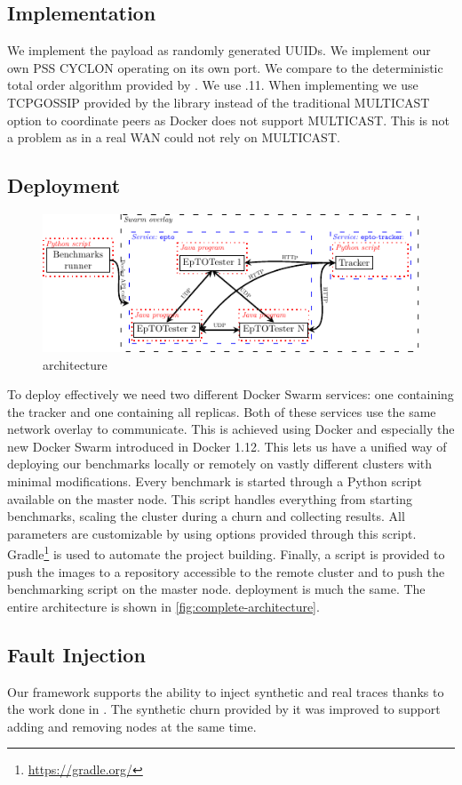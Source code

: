 \subsection{Implementation}
We implement the payload as randomly generated UUIDs. We implement our own PSS CYCLON operating on its own port.  We compare \epto to the deterministic total order algorithm provided by \jgroups. We use .11. When implementing \jgroups we use TCPGOSSIP provided by the \jgroups library instead of the traditional MULTICAST option to coordinate peers as Docker does not support MULTICAST. This is not a problem as in a real WAN \jgroups could not rely on MULTICAST.
\subsection{Deployment}
 \begin{figure}[htp]
 	\centering
 	\includegraphics[width=\linewidth]{figures/complete-architecture.pdf}
 	\vspace{-2mm} 
 	\caption[Caption]{\eptotester architecture\footnotemark}
 	\vspace{-2mm} 
 	\label{fig:complete-architecture}
 \end{figure}
To deploy \epto effectively we need two different Docker Swarm services: one containing the tracker and one containing all \epto replicas. Both of these services use the same network overlay to communicate. This is achieved using Docker and especially the new Docker Swarm introduced in Docker 1.12. This lets us have a unified way of deploying our benchmarks locally or remotely on vastly different clusters with minimal modifications. Every benchmark is started through a Python script available on the master node. This script handles everything from starting benchmarks, scaling the cluster during a churn and collecting results. All \epto parameters are customizable by using options provided through this script.
Gradle\footnote{\href{https://gradle.org/}{https://gradle.org/}} is used to automate the project building. Finally, a script is provided to push the images to a repository accessible to the remote cluster and to push the benchmarking script on the master node. \jgroups deployment is much the same. The entire \eptotester architecture is shown in \autoref{fig:complete-architecture}.
\subsection{Fault Injection}
Our framework supports the ability to inject synthetic and real traces thanks to the work done in \autocite{vaucher2016erasure}. The synthetic churn provided by it was improved to support adding and removing nodes at the same time.
